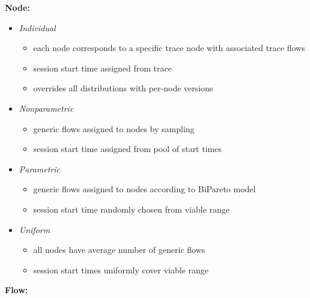 \noindent
\textbf{Node:}
\begin{itemize}
  \item \textit{Individual}
  \begin{itemize}
    \item each node corresponds to a specific trace node with associated trace flows
    \item session start time assigned from trace
    \item overrides all distributions with per-node versions
  \end{itemize}
  \item \textit{Nonparametric}
  \begin{itemize}
    \item generic flows assigned to nodes by sampling
    \item session start time assigned from pool of start times
  \end{itemize}
  \item \textit{Parametric}
  \begin{itemize}
    \item generic flows assigned to nodes according to BiPareto model
    \item session start time randomly chosen from viable range
  \end{itemize}
  \item \textit{Uniform}
  \begin{itemize}
    \item all nodes have average number of generic flows
    \item session start times uniformly cover viable range
  \end{itemize}
\end{itemize}
\noindent
\textbf{Flow:}
